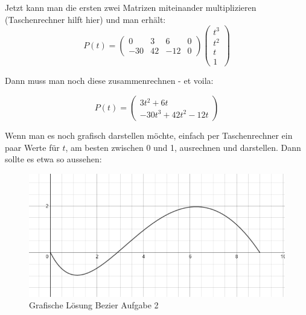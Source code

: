Jetzt kann man die ersten zwei Matrizen miteinander multiplizieren (Taschenrechner hilft hier) und man erhält:
\begin{displaymath}
P(t) = 
\begin{pmatrix}
0 & 3 & 6 & 0 \\
-30 & 42 & -12 & 0
\end{pmatrix}
\begin{pmatrix}
t^3\\
t^2\\
t\\
1
\end{pmatrix}
\end{displaymath}

Dann muss man noch diese zusammenrechnen - et voila:

\begin{displaymath}
P(t) = 
\begin{pmatrix}
3t^2+6t\\
-30t^3+42t^2-12t
\end{pmatrix}
\end{displaymath}

Wenn man es noch grafisch darstellen möchte, einfach per Taschenrechner ein paar Werte für \(t\), am besten zwischen 0 und 1, ausrechnen und darstellen. Dann sollte es etwa so aussehen:
\begin{figure}[!ht]
	\centering
	\includegraphics[width=0.5\linewidth]{fig/bezier_aufgabe2}
	\caption{Grafische Lösung Bezier Aufgabe 2}
	\label{fig:bezier_aufgabe2}
\end{figure}

